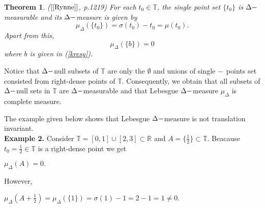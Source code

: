 \documentclass[12pt,a4paper,oneside,titlepage]{article}
\newtheorem{Twierdzenie}{Theorem}
\newcommand{\exmp}{Example }
\begin{document}
\begin{Twierdzenie} ($[\ref{Rynne}]$, p.1219)
For each $t_{0}\in \mathbb{T}$, the single point set $\lbrace t_{0} \rbrace$ is $\Delta \-- $measurable and its $\Delta \-- $measure is given by 
\begin{equation}
\nonumber
\mu_{\Delta}(\lbrace t_{0} \rbrace) = \sigma(t_{0})- t_{0}= \mu(t_0). 
\end{equation}
Apart from this,
\begin{equation}
\mu_{\Delta}(\lbrace b \rbrace) = 0
\end{equation}
where $b$ is given in (\ref{kresy}).
\end{Twierdzenie}















Notice that $\Delta \-- $null subsets of $\mathbb{T}$ are only the $\emptyset$ and unions of single $\--$ points set consisted from right-dense points of $\mathbb{T} $. Consequently, we obtain that all subsets of $\Delta \-- $null sets in $\mathbb{T}$ are $\Delta \-- $measurable and that Lebesgue $\Delta \-- $measure $\mu_{\Delta}$ is complete measure. 
\bigskip

The example given below shows that Lebesgue $\Delta \-- $measure is not translation invariant.  \\
\textbf{\exmp  2.} Consider $\mathbb{T}= [0,1] \cup [2,3] \subset \mathbb{R}$ and $A= \lbrace \frac{1}{2} \rbrace \subset \mathbb{T}$. Beacause $t_{0}= \frac{1}{2} \in \mathbb{T}$ is a right-dense point we get
\begin{center}
$\mu_{\Delta}(A)= 0.$
\end{center}
However,
\begin{center}
$\mu_{\Delta}(A+\frac{1}{2})= \mu_{\Delta}(\lbrace 1 \rbrace)= \sigma(1)-1=2-1=1\neq 0.$
\end{center}
\end{document}
